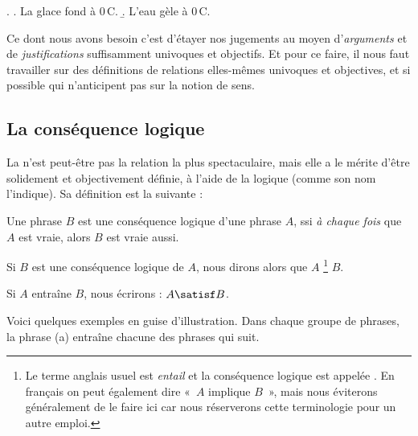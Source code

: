 \begin{refsegment}
\ex.
\a. La glace fond à 0\,\degres C.
\b. L'eau gèle à 0\,\degres C.


Ce dont nous avons besoin c'est d'étayer nos jugements au moyen d'\emph{arguments} et de \emph{justifications} suffisamment univoques et objectifs.  Et pour ce faire, il nous faut travailler sur des définitions de relations elles-mêmes univoques et objectives, et si possible qui n'anticipent pas sur la notion de sens. 






\subsection{La conséquence logique}
\label{s:conseql}

La  
n'est peut-être pas la relation la plus spectaculaire, mais elle a le mérite d'être
solidement et objectivement définie, à l'aide de la logique (comme son nom l'indique).  Sa définition est la suivante :


\begin{defi}%
\label{d:conseq}
Une phrase $B$ est une conséquence logique d'une phrase $A$,
ssi%
\emph{à
chaque fois} que $A$ est vraie, alors $B$ est vraie aussi.
\end{defi}%

\largerpage

Si $B$ est une conséquence logique de $A$, nous dirons alors que $A$ \footnote{Le terme anglais usuel
est \emph{entail} et la conséquence logique est appelée .  En français on peut également dire «~$A$ implique $B$~», mais nous éviterons généralement de le faire ici car
nous réserverons cette terminologie pour un autre emploi.} $B$.



\begin{nota}
Si $A$ entraîne $B$, nous écrirons : $A\satisf B$.
\end{nota}

Voici quelques exemples en guise d'illustration.  Dans chaque groupe
de phrases, la phrase (a) entraîne chacune des phrases qui suit.  



\end{refsegment}
